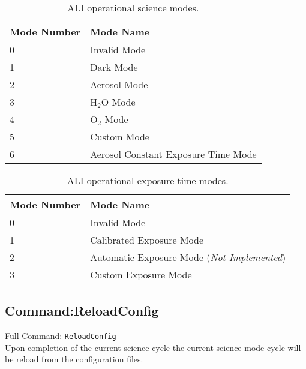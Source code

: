 \begin{table}
    \begin{center}
    \begin{tabular}{|l|l|}
    \hline
    Mode Number & Mode Name \\
    \hline
    0 & Invalid Mode \\
    \hline
    1 & Dark Mode \\
    \hline
    2 & Aerosol Mode \\
    \hline
    3 & H$_{2}$O Mode \\
    \hline
    4 & O$_{2}$ Mode \\
    \hline
    5 & Custom Mode \\
    \hline
    6 & Aerosol Constant Exposure Time Mode \\
    \hline
    \end{tabular}
    \end{center}
    \caption[ALI Operational Science Modes]{ALI operational science modes.}
    \label{tab:B.1:ScienceModes}
\end{table}


\begin{table}
    \begin{center}
    \begin{tabular}{|l|l|}
    \hline
    Mode Number & Mode Name \\
    \hline
    0 & Invalid Mode \\
    \hline
    1 & Calibrated Exposure Mode \\
    \hline
    2 & Automatic Exposure Mode (\textit{Not Implemented}) \\
    \hline
    3 & Custom Exposure Mode \\
    \hline
    \end{tabular}
    \end{center}
    \caption[ALI Operational Exposure Time Modes]{ALI operational exposure time modes.}
    \label{tab:B.1:ExposureModes}
\end{table}

\subsection{Command:ReloadConfig}

Full Command: \texttt{ReloadConfig}\\

Upon completion of the current science cycle the current science mode cycle will be reload from the configuration files.

